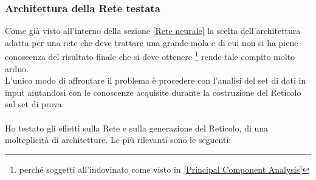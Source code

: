 \subsubsection{Architettura della Rete testata}
\label{Architettura della Rete testata 89}
Come già visto all'interno della sezione \ref{Rete neurale} la scelta dell'architettura adatta per una rete che deve trattare una grande mola e di cui non si ha piene conoscenza del risultato finale che si deve ottenere \footnote{perché soggetti all'indovinato come visto in \ref{Principal Component Analysis}} rende tale compito molto arduo.\\
L'unico modo di affrontare il problema è procedere con l'analisi del set di dati in input aiutandosi con le conoscenze acquisite durante la costruzione del Reticolo sul set di prova.\\\\
\noindent
Ho testato gli effetti sulla Rete e sulla generazione del Reticolo, di una molteplicit\`a di architetture. Le pi\`u rilevanti sono le seguenti:
